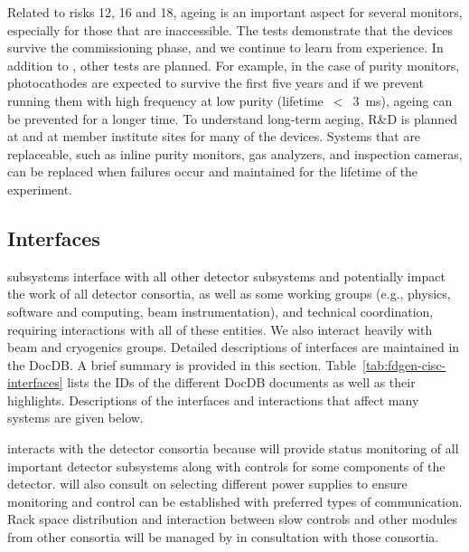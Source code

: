 Related to risks 12, 16 and 18, ageing is an important aspect for several monitors, especially for those that are inaccessible. The  tests demonstrate that the devices survive the commissioning phase, and we continue to learn from  experience. In addition to , other tests are planned. For example, in the case of purity monitors, photocathodes are expected to survive the first five years and if we prevent running them with high frequency at low purity (lifetime~$<$~\SI{3}{\milli\second}), ageing can be prevented for a longer time. To understand long-term aeging, R\&D is planned at  and at member institute sites for many of the devices. %
Systems that are replaceable, such as inline purity monitors, gas analyzers, and inspection cameras, can be replaced when failures occur and maintained for the lifetime of the experiment.
 





\subsection{Interfaces} 
\label{sec:interfaces}

 subsystems interface with all other detector subsystems and potentially impact the work of all detector consortia, as well as some
working groups (e.g., physics, software and computing, beam instrumentation), and technical coordination, requiring interactions with all of these entities.  We also interact heavily with  beam and cryogenics groups.  
Detailed descriptions of  interfaces are maintained in the  DocDB. A brief summary is provided in this section. Table~\ref{tab:fdgen-cisc-interfaces} lists the IDs of the different DocDB documents as well as their highlights. Descriptions of the interfaces and interactions that affect many systems are given below. 

 interacts with the detector consortia because  will provide status monitoring of all important detector subsystems along with controls for some components of the detector.
 will also consult on selecting different power supplies to ensure monitoring and control can be established with preferred types of communication. 
Rack space distribution and interaction between slow controls and other modules from other consortia will be managed by  in consultation with those consortia. 

